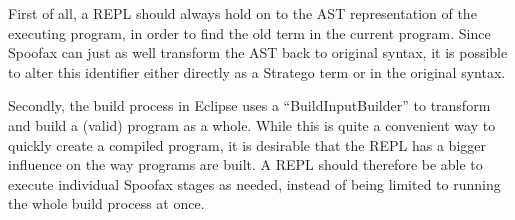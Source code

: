 First of all, a REPL should always hold on to the AST representation of the
executing program, in order to find the old term in the current program.
Since Spoofax can just as well transform the AST back to original syntax,
it is possible to alter this identifier either directly as a Stratego term or
in the original syntax.

Secondly, the build process in Eclipse uses a ``BuildInputBuilder'' to
transform and build a (valid) program as a whole. While this is quite
a convenient way to quickly create a compiled program, it is desirable
that the REPL has a bigger influence on the way programs are built. A
REPL should therefore be able to execute individual Spoofax stages as
needed, instead of being limited to running the whole build process at
once.

